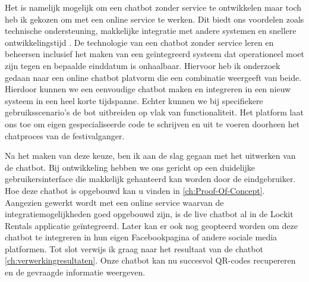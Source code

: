 Het is namelijk mogelijk om een chatbot zonder service te ontwikkelen maar toch heb ik gekozen om met een online service te werken. Dit biedt ons voordelen zoals technische ondersteuning, makkelijke integratie met andere systemen en snellere ontwikkelingstijd \autocite{Mercir2022} \autocite{folstad2021investigating}. De technologie van een chatbot zonder service leren en beheersen inclusief het maken van een geïntegreerd systeem dat operationeel moet zijn tegen en bepaalde einddatum is onhaalbaar. Hiervoor heb ik onderzoek gedaan naar een online chatbot platvorm die een combinatie weergeeft van beide. Hierdoor kunnen we een eenvoudige chatbot maken en integreren in een nieuw systeem in een heel korte tijdspanne. Echter kunnen we bij specifiekere gebruiksscenario’s de bot uitbreiden op vlak van functionaliteit. Het platform laat ons toe om eigen gespecialiseerde code te schrijven en uit te voeren doorheen het chatproces van de festivalganger. 


Na het maken van deze keuze, ben ik aan de slag gegaan met het uitwerken van de chatbot. Bij ontwikkeling hebben we ons gericht op een duidelijke gebruikersinterface die makkelijk gehanteerd kan worden door de eindgebruiker. Hoe deze chatbot is opgebouwd kan u vinden in \ref{ch:Proof-Of-Concept}. Aangezien gewerkt wordt met een online service waarvan de integratiemogelijkheden goed opgebouwd zijn, is de live chatbot al in de Lockit Rentals applicatie geïntegreerd. Later kan er ook nog geopteerd worden om deze chatbot te integreren in hun eigen Facebookpagina of andere sociale media platformen. 
Tot slot verwijs ik graag naar het resultaat van de chatbot \ref{ch:verwerkingresultaten}. Onze chatbot kan nu succesvol QR-codes recupereren en de gevraagde informatie weergeven.





